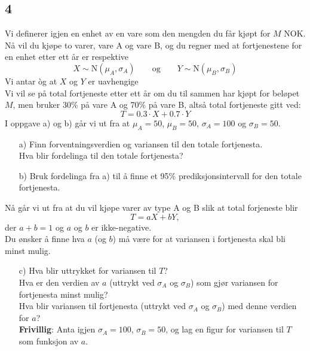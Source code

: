 \documentclass[10pt,a4paper]{article}
\begin{document}
\subsection*{4}
Vi definerer igjen en enhet av en vare 
som den mengden du f{\aa}r kj{\o}pt for $M$ NOK.
N{\aa} vil du kj{\o}pe to varer, vare A og vare B,
og du regner med at fortjenestene for en enhet etter ett {\aa}r er respektive
\[
X \sim \mbox{N}(\mu_A,\sigma_A)
\qquad\mbox{og}\qquad
Y \sim \mbox{N}(\mu_B,\sigma_B)
\]
Vi antar \`og at $X$ og $Y$ er uavhengige
\\
Vi vil se p{\aa} total fortjeneste etter ett {\aa}r om du til sammen har
kj{\o}pt for bel{\o}pet $M$, men bruker 30\% p{\aa} vare A og 70\% 
p{\aa} vare B, alts{\aa} total fortjeneste gitt ved:
\[
T = 0.3\cdot X + 0.7\cdot Y
\]
I oppgave a) og b) g{\aa}r vi ut fra at
$\mu_A=50$, $\mu_B=50$, $\sigma_A=100$ og $\sigma_B=50$.
\begin{itemize}
\item[a)]
Finn forventningsverdien og variansen til den totale fortjenesta.
\\
Hva blir fordelinga til den totale fortjenesta?
\end{itemize}
\begin{itemize}
\item[b)]
Bruk fordelinga fra a) til {\aa} finne et 
95\% prediksjonsintervall for den totale fortjenesta.
\end{itemize}
N{\aa} g{\aa}r vi ut fra at du vil kj{\o}pe varer av type A og B 
slik at total forjeneste blir
\[
T = aX + bY,
\]
der $a+b=1$ og $a$ og $b$ er ikke-negative.
\\
Du {\o}nsker {\aa} finne hva $a$ (og $b$)  m{\aa} v{\ae}re for at
variansen i fortjenesta skal bli minst mulig.
\begin{itemize}
\item[c)]
Hva blir uttrykket for variansen til $T$?
\\
Hva er den verdien av $a$ (uttrykt ved $\sigma_A$ og $\sigma_B$)
som gj{\o}r variansen for fortjenesta minst mulig?
\\
Hva blir variansen til fortjenesta (uttrykt ved $\sigma_A$ og $\sigma_B$) med denne verdien for $a$?
\\
{\bf Frivillig}: Anta igjen $\sigma_A=100$, $\sigma_B=50$, og lag en figur for variansen til $T$ 
som funksjon av $a$.
\end{itemize}
\end{document}
